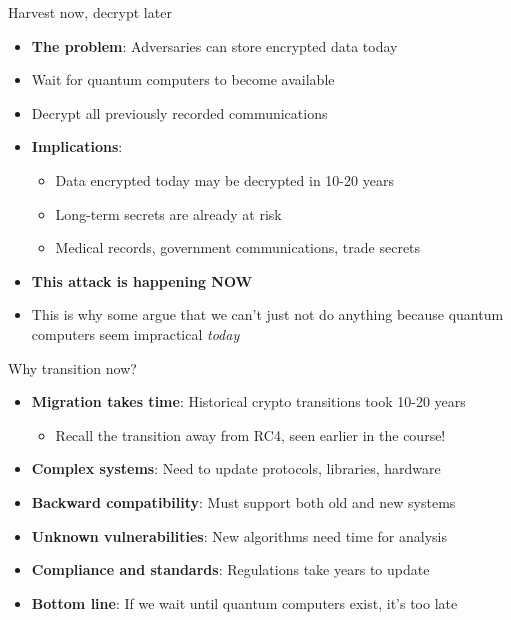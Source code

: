 \documentclass[aspectratio=169, lualatex, handout]{beamer}
\begin{document}
\begin{frame}{Harvest now, decrypt later}
	\begin{itemize}
		\item \textbf{The problem}: Adversaries can store encrypted data today
		\item Wait for quantum computers to become available
		\item Decrypt all previously recorded communications
		\item \textbf{Implications}:
		      \begin{itemize}
			      \item Data encrypted today may be decrypted in 10-20 years
			      \item Long-term secrets are already at risk
			      \item Medical records, government communications, trade secrets
		      \end{itemize}
		\item \textbf{This attack is happening NOW}
		\item This is why some argue that we can't just not do anything because quantum computers seem impractical \textit{today}
	\end{itemize}
\end{frame}

\begin{frame}{Why transition now?}
	\begin{itemize}
		\item \textbf{Migration takes time}: Historical crypto transitions took 10-20 years
		      \begin{itemize}
			      \item Recall the transition away from RC4, seen earlier in the course!
		      \end{itemize}
		\item \textbf{Complex systems}: Need to update protocols, libraries, hardware
		\item \textbf{Backward compatibility}: Must support both old and new systems
		\item \textbf{Unknown vulnerabilities}: New algorithms need time for analysis
		\item \textbf{Compliance and standards}: Regulations take years to update
		\item \textbf{Bottom line}: If we wait until quantum computers exist, it's too late
	\end{itemize}
\end{frame}
\end{document}
